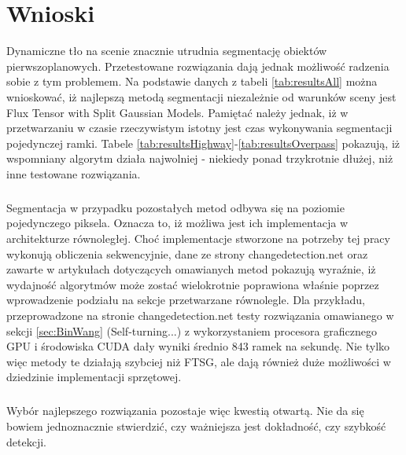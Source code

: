 \chapter{Wnioski}
\label{sec:wnioski}
Dynamiczne tło na scenie znacznie utrudnia segmentację obiektów pierwszoplanowych. Przetestowane rozwiązania dają jednak możliwość radzenia sobie z tym problemem. Na podstawie danych z tabeli \ref{tab:resultsAll} można wnioskować, iż najlepszą metodą segmentacji niezależnie od warunków sceny jest Flux Tensor with Split Gaussian Models. Pamiętać należy jednak, iż w przetwarzaniu w czasie rzeczywistym istotny jest czas wykonywania segmentacji pojedynczej ramki. Tabele \ref{tab:resultsHighway}-\ref{tab:resultsOverpass} pokazują, iż wspomniany algorytm działa najwolniej - niekiedy ponad trzykrotnie dłużej, niż inne testowane rozwiązania.
\paragraph{}
Segmentacja w przypadku pozostałych metod odbywa się na poziomie pojedynczego piksela. Oznacza to, iż możliwa jest ich implementacja w architekturze równoległej. Choć implementacje stworzone na potrzeby tej pracy wykonują obliczenia sekwencyjnie, dane ze strony changedetection.net oraz zawarte w artykułach dotyczących omawianych metod pokazują wyraźnie, iż wydajność algorytmów może zostać wielokrotnie poprawiona właśnie poprzez wprowadzenie podziału na sekcje przetwarzane równolegle. Dla przykładu, przeprowadzone na stronie changedetection.net testy rozwiązania omawianego w sekcji \ref{sec:BinWang} (Self-turning...) z wykorzystaniem procesora graficznego GPU i środowiska CUDA dały wyniki średnio 843 ramek na sekundę. Nie tylko więc metody te działają szybciej niż FTSG, ale dają również duże możliwości w dziedzinie implementacji sprzętowej.
\paragraph{}
Wybór najlepszego rozwiązania pozostaje więc kwestią otwartą. Nie da się bowiem jednoznacznie stwierdzić, czy ważniejsza jest dokładność, czy szybkość detekcji. 
